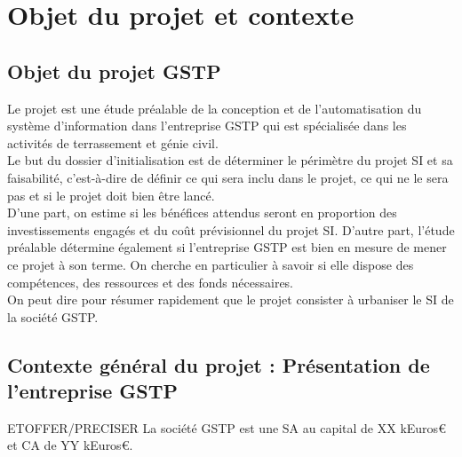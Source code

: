 \documentclass[12pt]{article}
\begin{document}
\maketitle


\section{Objet du projet et contexte}

\subsection{Objet du projet GSTP}
Le projet est une étude préalable de la conception et de l'automatisation
du système d'information dans l'entreprise GSTP qui est spécialisée dans
les activités de terrassement et génie civil.\\

Le but du dossier d'initialisation est de déterminer le périmètre du projet
SI et sa faisabilité, c’est-à-dire de définir ce qui sera inclu
dans le projet, ce qui ne le sera pas et si le projet doit bien être
lancé.\\

D’une part, on estime si les bénéfices attendus seront en proportion des
investissements engagés et du coût prévisionnel du projet SI.  D’autre
part, l’étude préalable détermine également si l’entreprise GSTP est
bien en mesure de mener ce projet à son terme. On cherche en particulier
à savoir si elle dispose des compétences, des ressources et des fonds
nécessaires.\\

On peut dire pour résumer rapidement que le projet consister à urbaniser le
SI de la société GSTP.


\subsection{Contexte général du projet : Présentation de l'entreprise GSTP}

ETOFFER/PRECISER
La société GSTP est une SA au capital de XX kEuros€ et CA de YY kEuros€.
\end{document}
